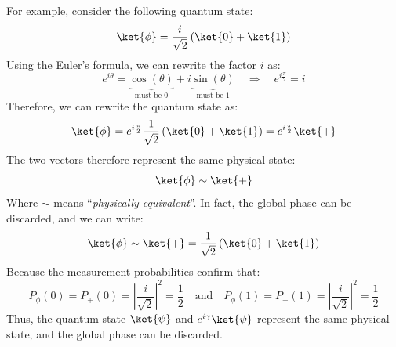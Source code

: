 \begin{itemize}
    \begin{examplebox}
        For example, consider the following quantum state:
        \begin{equation*}
            \ket{\phi} = \frac{i}{\sqrt{2}} \left(\ket{0} + \ket{1}\right)
        \end{equation*}
        Using the Euler's formula, we can rewrite the factor $i$ as:
        \begin{equation*}
            e^{i \theta} = \underbrace{\cos(\theta)}_{\text{must be 0}} + i \underbrace{\sin(\theta)}_{\text{must be 1}} \quad \Rightarrow \quad e^{i \frac{\pi}{2}} = i
        \end{equation*}
        Therefore, we can rewrite the quantum state as:
        \begin{equation*}
            \ket{\phi} = e^{i \frac{\pi}{2}} \frac{1}{\sqrt{2}} \left(\ket{0} + \ket{1}\right) = e^{i \frac{\pi}{2}} \ket{+}
        \end{equation*}
        The two vectors therefore represent the same physical state:
        \begin{equation*}
            \ket{\phi} \sim \ket{+}
        \end{equation*}
        Where $\sim$ means ``\emph{physically equivalent}''. In fact, the global phase can be discarded, and we can write:
        \begin{equation*}
            \ket{\phi} \sim \ket{+} = \frac{1}{\sqrt{2}} \left(\ket{0} + \ket{1}\right)
        \end{equation*}
        Because the measurement probabilities confirm that:
        \begin{equation*}
            P_{\phi}(0) = P_{+}(0) = \left|\frac{i}{\sqrt{2}}\right|^{2} = \frac{1}{2} \quad \text{and} \quad P_{\phi}(1) = P_{+}(1) = \left|\frac{i}{\sqrt{2}}\right|^{2} = \frac{1}{2}
        \end{equation*}
        Thus, the quantum state $\ket{\psi}$ and $e^{i \gamma} \ket{\psi}$ represent the same physical state, and the global phase can be discarded.
    \end{examplebox}



\end{itemize}
